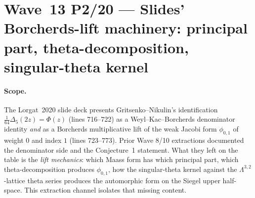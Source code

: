 
\providecommand{\kBKM}{\kappa_{\mathrm{BKM}}}
\providecommand{\kch}{\kappa_{\mathrm{ch}}}
\providecommand{\gDelta}{\mathfrak{g}_{\Delta_5}}
\providecommand{\ZZ}{\mathbb{Z}}
\providecommand{\RR}{\mathbb{R}}
\providecommand{\CC}{\mathbb{C}}
\providecommand{\HH}{\mathbb{H}}
\providecommand{\Oo}{\mathrm{O}}
\providecommand{\Sp}{\mathrm{Sp}}
\providecommand{\Lat}{\Lambda}
\providecommand{\ClaimStatusTheorem}{\textbf{[Theorem]}}
\providecommand{\ClaimStatusRemark}{\textbf{[Remark]}}

\section*{Wave~13 P2/20 --- Slides' Borcherds-lift machinery: principal part, theta-decomposition, singular-theta kernel}
\label{sec:wave13-p2-slides-borcherds-lift}

\paragraph{Scope.} The Lorgat~2020 slide deck presents Gritsenko--Nikulin's
identification $\tfrac{1}{64}\Delta_5(2z)=\Phi(z)$ (lines 716--722) as a
Weyl--Kac--Borcherds denominator identity \emph{and} as a Borcherds
multiplicative lift of the weak Jacobi form $\phi_{0,1}$ of weight $0$
and index $1$ (lines 723--773). Prior Wave 8/10 extractions documented
the denominator side and the Conjecture~1 statement. What they left on
the table is the \emph{lift mechanics}: which Maass form has which
principal part, which theta-decomposition produces $\phi_{0,1}$, how the
singular-theta kernel against the $\Lat^{3,2}$-lattice theta series
produces the automorphic form on the Siegel upper half-space. This
extraction channel isolates that missing content.

